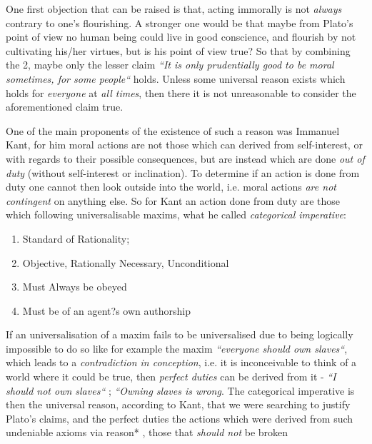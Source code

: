 \documentclass[english,course]{Notes}
\newcommand{\ita}[1]{\textit{#1}}
\begin{document}
\par{One first objection that can be raised is that, acting immorally is not \ita{always} contrary to one's flourishing. A stronger one would be that maybe from Plato's point of view no human being could live in good conscience, and flourish by not cultivating his/her virtues, but is his point of view true? So that  by combining the 2, maybe only the lesser claim \ita{``It is only prudentially good to be moral sometimes, for some people``} holds. Unless some universal reason exists which holds for \ita{everyone} at \ita{all times}, then there it is not unreasonable to consider the aforementioned claim true. }

\par{One of the main proponents of the existence of such a reason was Immanuel Kant, for him moral actions are not those which can derived from self-interest, or with regards to their possible consequences, but are instead which are done \ita{out of duty} (without self-interest or inclination). To determine if an action is done from duty one cannot then look outside into the world, i.e. moral actions \ita{are not contingent} on anything else. So for Kant an action done from duty are those which following universalisable maxims, what he called \ita{categorical imperative}:}
\begin{enumerate}
    \item Standard of Rationality;
    \item Objective, Rationally Necessary, Unconditional
    \item Must Always be obeyed
    \item Must be of an agent?s own authorship
\end{enumerate}

\par{If an universalisation of a maxim fails to be universalised due to being logically impossible to do so like for example the maxim \ita{``everyone should own slaves``}, which leads to a \ita{contradiction in conception}, i.e. it is inconceivable to think of a world where it could be true, then \ita{perfect duties} can be derived from it - \ita{``I should not own slaves``} ; \ita{``Owning slaves is wrong}. The categorical imperative is then the universal reason, according to Kant, that we were searching to justify Plato's claims, and the perfect duties the actions which were derived from such undeniable axioms via reason* , those that \ita{should not} be broken \\ }
    
\end{document}
